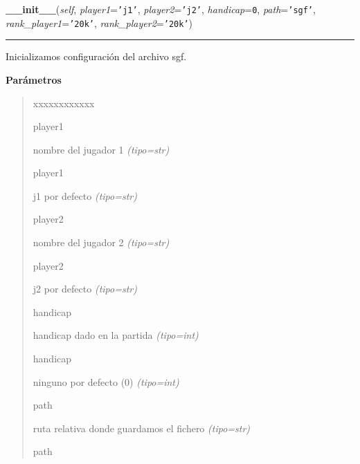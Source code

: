 \hspace{.8\funcindent}\begin{boxedminipage}{\funcwidth}

    \raggedright \textbf{\_\_init\_\_}(\textit{self}, \textit{player1}={\tt \texttt{'}\texttt{j1}\texttt{'}}, \textit{player2}={\tt \texttt{'}\texttt{j2}\texttt{'}}, \textit{handicap}={\tt 0}, \textit{path}={\tt \texttt{'}\texttt{sgf}\texttt{'}}, \textit{rank\_player1}={\tt \texttt{'}\texttt{20k}\texttt{'}}, \textit{rank\_player2}={\tt \texttt{'}\texttt{20k}\texttt{'}})

    \vspace{-1.5ex}

    \rule{\textwidth}{0.5\fboxrule}
\setlength{\parskip}{2ex}
Inicializamos configuración del archivo sgf.

\setlength{\parskip}{1ex}
      \textbf{Parámetros}
      \vspace{-1ex}

      \begin{quote}
        \begin{Ventry}{xxxxxxxxxxxx}

          \item[player1]


nombre del jugador 1
            {\it (tipo=str)}

          \item[player1]


j1 por defecto
            {\it (tipo=str)}

          \item[player2]


nombre del jugador 2
            {\it (tipo=str)}

          \item[player2]


j2 por defecto
            {\it (tipo=str)}

          \item[handicap]


handicap dado en la partida
            {\it (tipo=int)}

          \item[handicap]


ninguno por defecto (0)
            {\it (tipo=int)}

          \item[path]


ruta relativa donde guardamos el fichero
            {\it (tipo=str)}

          \item[path]



\end{Ventry}
\end{quote}
\end{boxedminipage}
